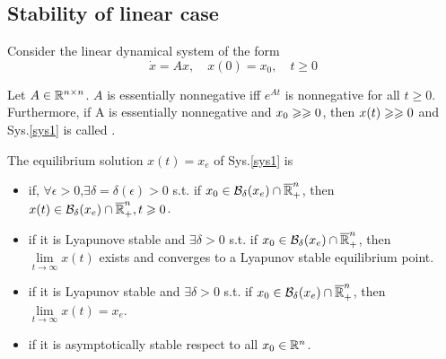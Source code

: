 \documentclass{paper}
\begin{document}
\subsection{Stability of linear case}
Consider the linear dynamical system of the form
\begin{equation}\label{sys1}
\dot{x}=Ax,\quad x(0)=x_0,\quad t\geqslant 0
\end{equation}
\begin{lem}\label{lem2}
Let $A\in \mathbb{R}^{n\times n}$. $A$ is essentially nonnegative iff $e^{At}$ is nonnegative for all $t\geqslant 0$.
Furthermore, if A is essentially nonnegative and $x_0\geqslant\geqslant 0$, then $x(t)\geqslant\geqslant 0$ and Sys.\ref{sys1} is
called .
\end{lem}
\begin{defi}
The equilibrium solution $x(t)=x_e$ of Sys.\ref{sys1} is 
\begin{itemize}
\item {} if, $\forall\epsilon>0$,$\exists \delta=\delta(\epsilon)>0$ s.t. if $x_0\in 
\mathcal{B}_{\delta}(x_e) \cap \overline{\mathbb{R}}_{+}^{n}$, then $x(t) \in \mathcal{B}_{\delta}(x_e) \cap \overline{\mathbb{R}}_{+}^{n}, t\geqslant 0$.
\item {} if it is Lyapunove stable and $\exists \delta>0$ s.t. if $x_0\in \mathcal{B}_{\delta}(x_e) \cap \overline{\mathbb{R}}_{+}^{n}$,
then $\lim\limits_{t\rightarrow\infty}x(t)$ exists and converges to a Lyapunov stable equilibrium point.
\item {} if it is Lyapunov stable and $\exists \delta>0$ s.t. if $x_0\in \mathcal{B}_{\delta}(x_e) \cap
\overline{\mathbb{R}}_{+}^{n}$, then $\lim\limits_{t\rightarrow\infty}x(t)=x_e$.
\item {} if it is asymptotically stable respect to all $x_0\in\mathbb{R}^{n}$.
\end{itemize}
\end{defi}
\end{document}
